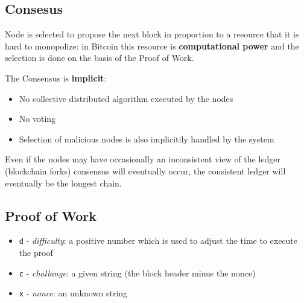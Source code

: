 
\subsection{Consesus}
Node is selected to propose the next block in proportion to a resource that it is hard to
monopolize: in Bitcoin this resource is \textbf{computational power} and the selection is done on the basis of the Proof of Work.

{The Consensus is \textbf{implicit}:\ns
\begin{itemize}
   \item No collective distributed algorithm executed by the nodes
   \item No voting
   \item Selection of malicious nodes is also implicitily handled by the system
\end{itemize}}

Even if the nodes may have occasionally an inconsistent view of the ledger (blockchain forks) consensus will eventually occur, the consistent ledger will eventually be the longest chain.

\subsection{Proof of Work}
\begin{itemize}
   \item \texttt{d} - \textit{difficulty}: a positive number which is used to adjust the time to execute the proof
   \item \texttt{c} - \textit{challange}: a given string (the block header minus the nonce)
   \item \texttt{x} - \textit{nonce}: an unknown string
\end{itemize}


